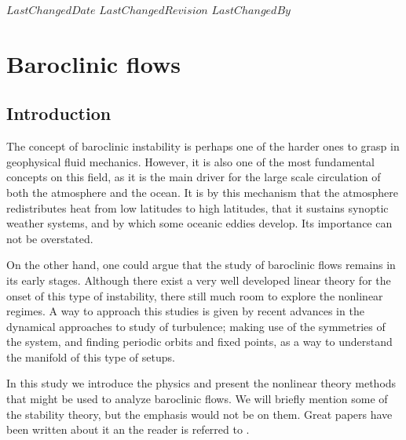 {$LastChangedDate$}
{$LastChangedRevision$} {$LastChangedBy$}

\chapter{Baroclinic flows}
\label{chap:baroclinic}

\section{Introduction}
\label{s:intro}

The concept of baroclinic instability is perhaps one of the harder ones
to grasp in geophysical fluid mechanics. However, it is also one of the
most fundamental concepts on this field, as it is the main driver for the
large scale circulation of both the atmosphere and the ocean. It is by this
mechanism that the atmosphere redistributes heat from low latitudes to
high latitudes, that it sustains synoptic weather systems, and by which
some oceanic eddies develop. Its importance can not be
overstated.

On the other hand, one could argue that the study of baroclinic flows
remains in its early stages. Although there exist a very well developed
linear theory for the onset of this type of instability, there still much
room to explore the nonlinear regimes. A way to approach this studies is
given by recent advances in the dynamical approaches to study of
turbulence;
making use of the symmetries of the system, and finding periodic orbits
and fixed points, as a way to understand the manifold of this type of
setups.

In this study we introduce the physics and present the nonlinear theory
methods that might be used to analyze baroclinic flows. We will briefly
mention some of the stability theory, but the emphasis would not be on
them. Great papers have been written about it an the reader is referred
to .

